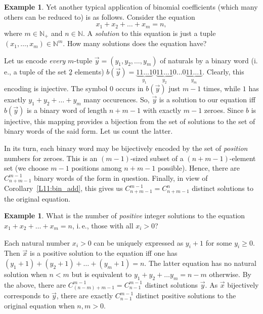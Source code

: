 \documentclass[12pt,notitlepage]{article}
\theoremstyle{plain}
\theoremstyle{definition}
\newtheorem{exm}[thm]{Example}
\theoremstyle{plain}
\newcommand{\N}{\mathbb{N}}
\newcommand{\ul}[1]{\underline{#1}}
\newcommand{\1}{\mathbf{1}}
\newcommand{\0}{\mathbf{0}}
\newcommand{\mcomm}[1]{}
\begin{document}
\begin{exm}
Yet another typical application of binomial coefficients (which many others can be reduced to) is as follows. Consider the equation
$$x_1 + x_2 + \ldots + x_m = n,$$
where $m \in \N_+$ and $n \in \N$. A \emph{solution} to this equation is just a tuple $(x_1,\ldots, x_m) \in \N^m$. How many solutions does the equation have?

Let us encode \emph{every} $m$-tuple $\vec y = (y_1, y_2, \ldots,y_m)$ of naturals by a binary word (i.\,e., a tuple of the set $\ul{2}$ elements) $b(\vec y) = \underbrace{11\ldots1}_{y_1}0\underbrace{11\ldots1}_{y_2}0\ldots 0 \underbrace{11\ldots1}_{y_m}$. Clearly, this encoding is injective. The symbol $0$ occurs in $b(\vec y)$ just $m - 1$ times, while $1$ has exactly $y_1 + y_2 + \ldots + y_m$ many occurences. So, $\vec y$ is a solution to our equation iff $b(\vec y)$ is a binary word of length $n + m - 1$ with exactly $m - 1$ zeroes. Since $b$ is injective, this mapping provides a bijection from the set of solutions to the set of binary words of the said form. Let us count the latter.

In its turn, each binary word may be bijectively encoded by the set of \emph{position} numbers for zeroes. This is an $(m-1)$-sized subset of a $(n + m - 1)$-element set (we choose $m-1$ positions among $n + m -1$ possible). Hence, there are $C_{n + m -1}^{m - 1}$ binary words of the form in question. Finally, in view of Corollary~\ref{L11:bin_add}, this gives us $C_{n + m -1}^{m - 1} = C_{n + m -1}^{n}$ distinct solutions to the original equation.
\end{exm}
\mcomm{It is important to highlight diverse bijections and `encodings' which reduce a problem to formal primitives. For a seminar class, we recommend to make them explicit in a few introductory problems and switch to the traditional ``intuitive'' style afterward (except for the most tricky arguments). Ideally, students should be able to translate intuitive combinatorial proofs into the set-theoretic formalism freely. The fact that most traditional combinatorial problems are stated informally makes this task quite hard.}
\begin{exm}
What is the number of \emph{positive} integer solutions to the equation $x_1 + x_2 + \ldots + x_m = n$, i.\,e., those with all $x_i > 0$?

Each natural number $x_i > 0$ can be uniquely expressed as $y_i + 1$ for some $y_i \geq 0$. Then $\vec x$ is a positive solution to the equation iff one has $(y_1 + 1) + (y_2 + 1) + \ldots + (y_m + 1) = n$. The latter equation has no natural solution when $n < m$ but is equivalent to $y_1 + y_2 + \ldots y_m = n - m$ otherwise. By the above, there are $C_{(n - m) + m - 1}^{m - 1} = C_{n - 1}^{m - 1}$ distinct solutions $\vec y$. As $\vec x$ bijectively corresponds to $\vec y$, there are exactly $C_{n - 1}^{m - 1}$ distinct positive solutions to the original equation when $n, m > 0$.
\end{exm}
\end{document}
